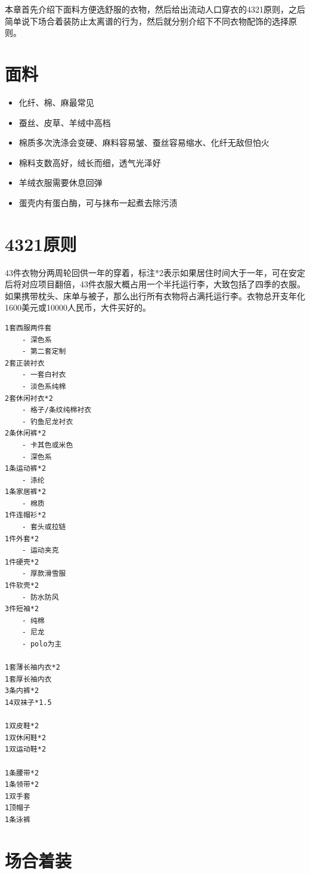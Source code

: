 \documentclass[
  letterpaper,
  DIV=11,
  numbers=noendperiod]{scrreprt}
\providecommand{\tightlist}{%
  \setlength{\itemsep}{0pt}\setlength{\parskip}{0pt}}\usepackage{longtable,booktabs,array}
\begin{document}
本章首先介绍下面料方便选舒服的衣物，然后给出流动人口穿衣的4321原则，之后简单说下场合着装防止太离谱的行为，然后就分别介绍下不同衣物配饰的选择原则。

\section{面料}\label{ux9762ux6599}

\begin{itemize}
\tightlist
\item
  化纤、棉、麻最常见
\item
  蚕丝、皮草、羊绒中高档
\item
  棉质多次洗涤会变硬、麻料容易皱、蚕丝容易缩水、化纤无敌但怕火
\item
  棉料支数高好，绒长而细，透气光泽好
\item
  羊绒衣服需要休息回弹
\item
  蛋壳内有蛋白酶，可与抹布一起煮去除污渍
\end{itemize}

\section{4321原则}\label{ux539fux5219}

43件衣物分两周轮回供一年的穿着，标注*2表示如果居住时间大于一年，可在安定后将对应项目翻倍，43件衣服大概占用一个半托运行李，大致包括了四季的衣服。如果携带枕头、床单与被子，那么出行所有衣物将占满托运行李。衣物总开支年化1600美元或10000人民币，大件买好的。

\begin{verbatim}
1套西服两件套
    - 深色系
    - 第二套定制
2套正装衬衣
    - 一套白衬衣
    - 淡色系纯棉
2套休闲衬衣*2
    - 格子/条纹纯棉衬衣
    - 钓鱼尼龙衬衣
2条休闲裤*2
    - 卡其色或米色
    - 深色系
1条运动裤*2
    - 涤纶
1条家居裤*2
    - 棉质
1件连帽衫*2
    - 套头或拉链
1件外套*2
    - 运动夹克
1件硬壳*2
    - 厚款滑雪服
1件软壳*2
    - 防水防风
3件短袖*2
    - 纯棉
    - 尼龙
    - polo为主

1套薄长袖内衣*2
1套厚长袖内衣
3条内裤*2
14双袜子*1.5

1双皮鞋*2
1双休闲鞋*2
1双运动鞋*2

1条腰带*2
1条领带*2
1双手套
1顶帽子
1条泳裤
\end{verbatim}

\section{场合着装}\label{ux573aux5408ux7740ux88c5}
\end{document}
